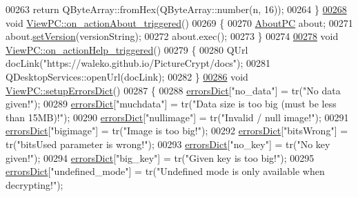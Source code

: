 \begin{DoxyCode}
00263     \textcolor{keywordflow}{return} QByteArray::fromHex(QByteArray::number(n, 16));
00264 \}
\hypertarget{viewpc_8cpp_source.tex_l00268}{}\hyperlink{class_view_p_c_a09a46da4d492eb3dde88f35dc58c997b}{00268} \textcolor{keywordtype}{void} \hyperlink{class_view_p_c_a09a46da4d492eb3dde88f35dc58c997b}{ViewPC::on\_actionAbout\_triggered}()
00269 \{
00270     \hyperlink{class_about_p_c}{AboutPC} about;
00271     about.\hyperlink{class_about_p_c_aa3815d4826d0c8d87122449537a0a4d5}{setVersion}(versionString);
00272     about.exec();
00273 \}
00274 
\hypertarget{viewpc_8cpp_source.tex_l00278}{}\hyperlink{class_view_p_c_a0d252ff4829260c6c76769fbd24b7cd7}{00278} \textcolor{keywordtype}{void} \hyperlink{class_view_p_c_a0d252ff4829260c6c76769fbd24b7cd7}{ViewPC::on\_actionHelp\_triggered}()
00279 \{
00280     QUrl docLink(\textcolor{stringliteral}{"https://waleko.github.io/PictureCrypt/docs"});
00281     QDesktopServices::openUrl(docLink);
00282 \}
\hypertarget{viewpc_8cpp_source.tex_l00286}{}\hyperlink{class_view_p_c_a89236a0bb8760f02e984b85a8571934c}{00286} \textcolor{keywordtype}{void} \hyperlink{class_view_p_c_a89236a0bb8760f02e984b85a8571934c}{ViewPC::setupErrorsDict}()
00287 \{
00288     \hyperlink{class_view_p_c_aaf7f058e5589d65fec72a21abfd5629b}{errorsDict}[\textcolor{stringliteral}{"no\_data"}] = tr(\textcolor{stringliteral}{"No data given!"});
00289     \hyperlink{class_view_p_c_aaf7f058e5589d65fec72a21abfd5629b}{errorsDict}[\textcolor{stringliteral}{"muchdata"}] = tr(\textcolor{stringliteral}{"Data size is too big (must be less than 15MB)!"});
00290     \hyperlink{class_view_p_c_aaf7f058e5589d65fec72a21abfd5629b}{errorsDict}[\textcolor{stringliteral}{"nullimage"}] = tr(\textcolor{stringliteral}{"Invalid / null image!"});
00291     \hyperlink{class_view_p_c_aaf7f058e5589d65fec72a21abfd5629b}{errorsDict}[\textcolor{stringliteral}{"bigimage"}] = tr(\textcolor{stringliteral}{"Image is too big!"});
00292     \hyperlink{class_view_p_c_aaf7f058e5589d65fec72a21abfd5629b}{errorsDict}[\textcolor{stringliteral}{"bitsWrong"}] = tr(\textcolor{stringliteral}{"bitsUsed parameter is wrong!"});
00293     \hyperlink{class_view_p_c_aaf7f058e5589d65fec72a21abfd5629b}{errorsDict}[\textcolor{stringliteral}{"no\_key"}] = tr(\textcolor{stringliteral}{"No key given!"});
00294     \hyperlink{class_view_p_c_aaf7f058e5589d65fec72a21abfd5629b}{errorsDict}[\textcolor{stringliteral}{"big\_key"}] = tr(\textcolor{stringliteral}{"Given key is too big!"});
00295     \hyperlink{class_view_p_c_aaf7f058e5589d65fec72a21abfd5629b}{errorsDict}[\textcolor{stringliteral}{"undefined\_mode"}] = tr(\textcolor{stringliteral}{"Undefined mode is only available when decrypting!"});

\end{DoxyCode}
